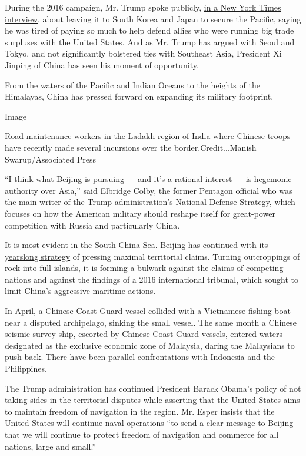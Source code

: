During the 2016 campaign, Mr. Trump spoke publicly,
\href{https://www.nytimes.com/2016/03/27/us/politics/donald-trump-foreign-policy.html}{in
a New York Times interview}, about leaving it to South Korea and Japan
to secure the Pacific, saying he was tired of paying so much to help
defend allies who were running big trade surpluses with the United
States. And as Mr. Trump has argued with Seoul and Tokyo, and not
significantly bolstered ties with Southeast Asia, President Xi Jinping
of China has seen his moment of opportunity.

From the waters of the Pacific and Indian Oceans to the heights of the
Himalayas, China has pressed forward on expanding its military
footprint.

Image

Road maintenance workers in the Ladakh region of India where Chinese
troops have recently made several incursions over the
border.Credit...Manish Swarup/Associated Press

``I think what Beijing is pursuing --- and it's a rational interest ---
is hegemonic authority over Asia,'' said Elbridge Colby, the former
Pentagon official who was the main writer of the Trump administration's
\href{https://dod.defense.gov/Portals/1/Documents/pubs/2018-National-Defense-Strategy-Summary.pdf}{National
Defense Strategy}, which focuses on how the American military should
reshape itself for great-power competition with Russia and particularly
China.

It is most evident in the South China Sea. Beijing has continued with
\href{https://www.washingtonpost.com/politics/2020/05/07/does-global-pandemic-open-new-south-china-sea-opportunities-beijing-not-really/}{its
yearslong strategy} of pressing maximal territorial claims. Turning
outcroppings of rock into full islands, it is forming a bulwark against
the claims of competing nations and against the findings of a 2016
international tribunal, which sought to limit China's aggressive
maritime actions.

In April, a Chinese Coast Guard vessel collided with a Vietnamese
fishing boat near a disputed archipelago, sinking the small vessel. The
same month a Chinese seismic survey ship, escorted by Chinese Coast
Guard vessels, entered waters designated as the exclusive economic zone
of Malaysia, daring the Malaysians to push back. There have been
parallel confrontations with Indonesia and the Philippines.

The Trump administration has continued President Barack Obama's policy
of not taking sides in the territorial disputes while asserting that the
United States aims to maintain freedom of navigation in the region. Mr.
Esper insists that the United States will continue naval operations ``to
send a clear message to Beijing that we will continue to protect freedom
of navigation and commerce for all nations, large and small.''


